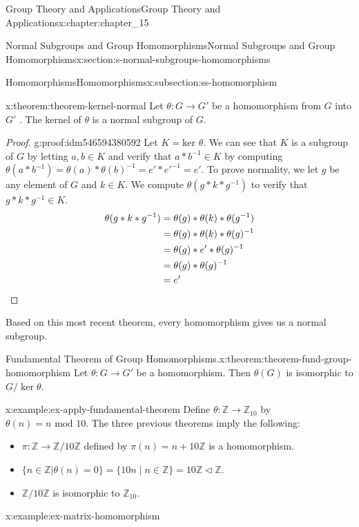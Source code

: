 \documentclass[oneside,10pt,]{book}
\newcommand{\qedhere}{\relax}
\numberwithin{equation}{section}
\begin{document}
\begin{chapterptx}{Group Theory and Applications}{}{Group Theory and Applications}{}{}{x:chapter:chapter_15}
\begin{sectionptx}{Normal Subgroups and Group Homomorphisms}{}{Normal Subgroups and Group Homomorphisms}{}{}{x:section:s-normal-subgroups-homomorphisms}
\begin{subsectionptx}{Homomorphisms}{}{Homomorphisms}{}{}{x:subsection:ss-homomorphism}
\begin{theorem}{}{}{x:theorem:theorem-kernel-normal}
Let \(\theta: G \to  G'\) be a homomorphism from  \(G\)  into  \(G'\) . The kernel of \(\theta\) is a normal subgroup of \(G\).%
\end{theorem}
\begin{proof}{}{g:proof:idm546594380592}
Let \(K=\textrm{ker }\theta\). We can see that \(K\) is a subgroup of \(G\) by letting \(a,b \in K\) and verify that \(a*b^{-1} \in K\) by computing \(\theta(a*b^{-1})= \theta(a)*\theta(b)^{-1} = e'*e'^{-1}=e'\).  To prove normality, we let \(g\) be any element of \(G\) and \(k \in K\).  We compute \(\theta(g*k*g^{-1})\) to verify that \(g*k*g^{-1}\in K\).%
\begin{equation*}
\begin{split}
\theta(g*k*g^{-1}) &=\theta(g)*\theta(k)*\theta(g^{-1})\\
& =\theta(g)*\theta(k)*\theta(g)^{-1}\\
& =\theta(g)*e'*\theta(g)^{-1}\\
& =\theta(g)* \theta(g)^{-1}\\
& =e'\\
\end{split}\qedhere
\end{equation*}
%
\end{proof}
Based on this most recent theorem, every homomorphism gives us a normal subgroup.%
\begin{theorem}{Fundamental Theorem of Group Homomorphisms.}{}{x:theorem:theorem-fund-group-homomorphism}%
%
Let \(\theta: G \to  G'\) be a homomorphism.  Then \(\theta(G)\) is isomorphic to \(G/\ker \theta\).%
\end{theorem}
\begin{example}{}{x:example:ex-apply-fundamental-theorem}%
Define  \(\theta: \mathbb{Z} \rightarrow  \mathbb{Z}_{10}\) by \(\theta(n) = n \textrm{ mod }10\). The three previous theorems imply the following:%
\begin{itemize}[label=\textbullet]
\item{}\(\pi: \mathbb{Z} \rightarrow  \mathbb{Z}/10\mathbb{Z}\) defined by \(\pi(n) = n + 10\mathbb{Z}\) is a homomorphism.%
\item{}\(\{n\in \mathbb{Z}|\theta(n) = 0\} = \{10n \mid n \in \mathbb{Z}\}= 10\mathbb{Z} \triangleleft  \mathbb{Z}\).%
\item{}\(\mathbb{Z}/10\mathbb{Z}\) is isomorphic to \(\mathbb{Z}_{10}\).%
\end{itemize}
%
\end{example}
\begin{example}{}{x:example:ex-matrix-homomorphism}%

\end{example}
\end{subsectionptx}
\end{sectionptx}
\end{chapterptx}
\end{document}
